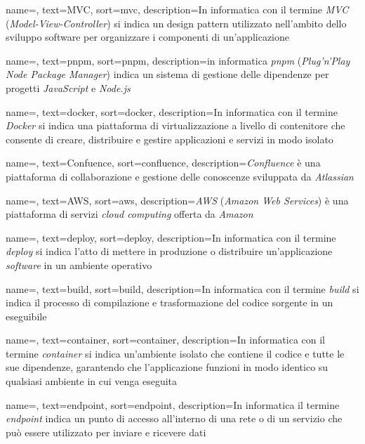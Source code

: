  {
    name=,
    text=MVC,
    sort=mvc,
    description={In informatica con il termine \emph{MVC} (\emph{Model-View-Controller}) si indica un design pattern utilizzato nell'ambito dello sviluppo software per organizzare i componenti di un'applicazione}
}

 {
    name=,
    text=pnpm,
    sort=pnpm,
    description={in informatica \emph{pnpm} (\emph{Plug'n'Play Node Package Manager}) indica un sistema di gestione delle dipendenze per progetti \emph{JavaScript} e \emph{Node.js}}
}

 {
    name=,
    text=docker,
    sort=docker,
    description={In informatica con il termine \emph{Docker} si indica una piattaforma di virtualizzazione a livello di contenitore che consente di creare, distribuire e gestire applicazioni e servizi in modo isolato}
}

 {
    name=,
    text=Confuence,
    sort=confluence,
    description={\emph{Confluence} è una piattaforma di collaborazione e gestione delle conoscenze sviluppata da \emph{Atlassian}}
}

 {
    name=,
    text=AWS,
    sort=aws,
    description={\emph{AWS} (\emph{Amazon Web Services}) è una piattaforma di servizi \emph{cloud computing} offerta da \emph{Amazon}}
}

 {
    name=,
    text=deploy,
    sort=deploy,
    description={In informatica con il termine \emph{deploy} si indica l'atto di mettere in produzione o distribuire un'applicazione \emph{software} in un ambiente operativo}
}

 {
    name=,
    text=build,
    sort=build,
    description={In informatica con il termine \emph{build} si indica il processo di compilazione e trasformazione del codice sorgente in un eseguibile}
}

 {
    name=,
    text=container,
    sort=container,
    description={In informatica con il termine \emph{container} si indica un'ambiente isolato che contiene il codice e tutte le sue dipendenze, garantendo che l'applicazione funzioni in modo identico su qualsiasi ambiente in cui venga eseguita}
}

 {
    name=,
    text=endpoint,
    sort=endpoint,
    description={In informatica il termine \emph{endpoint} indica un punto di accesso all'interno di una rete o di un servizio che può essere utilizzato per inviare e ricevere dati}
}

